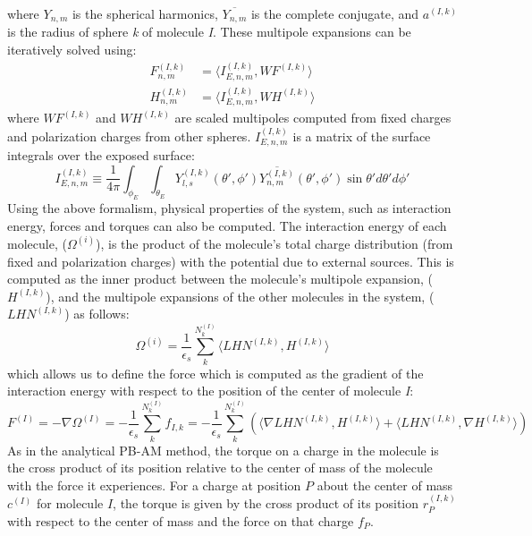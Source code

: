 \documentclass[12pt,titlepage]{article}
\begin{document}
%
where \(Y_{n,m}\) is the spherical harmonics, $\overline{Y_{n,m}}$ is the complete conjugate, and \(a^{(I,k)}\) is the radius of sphere \textit{k} of molecule \textit{I}.
These multipole expansions can be iteratively solved using:
%
\begin{align}
	F_{n,m}^{(I,k)} &= \langle I_{E, n,m} ^{(I,k)}, WF^{(I,k)} \rangle \label{eq:fmat_it} \\
	H_{n,m}^{(I,k)} &= \langle I_{E, n,m} ^{(I,k)}, WH^{(I,k)} \rangle
	\label{eq:hmat_it}
\end{align}
%
where $WF^{(I,k)}$ and $WH^{(I,k)}$ are scaled multipoles computed from fixed charges and polarization charges from other spheres.
\(I_{E,n,m}^{(I,k)}\) is a matrix of the surface integrals over the exposed surface:
%
\begin{equation}
	I_{E, n,m} ^{(I,k)} \equiv \frac{1}{4\pi } \int_{\phi_E} \int_{\theta_E} Y_{l,s}^{(I,k)}  (\theta', \phi') \overline{Y_{n,m}^{(I,k)}} (\theta', \phi') \sin \theta' d\theta' d \phi' 
	\label{eq:imat}
\end{equation}
%
Using the above formalism, physical properties of the system, such as interaction energy, forces and torques can also be computed.
The interaction energy of each molecule, ($\Omega^{(i)}$), is the product of the molecule's total charge distribution (from fixed and polarization charges) with the potential due to external sources.
This is computed as the inner product between the molecule's multipole expansion, ($H^{(I,k)}$), and the multipole expansions of the other molecules in the system, ($LHN^{(I,k)}$) as follows:
%
\begin{equation}
	\Omega^{(i)} = \frac{1}{\epsilon_s} \sum_{k}^{N_k^{(I)}}  \langle LHN^{(I,k)}, H^{(I,k)} \rangle
	\label{eq:pbsam_en_interact}
\end{equation}
%
which allows us to define the force which is computed as the gradient of the interaction energy with respect to the position of the center of molecule \textit{I}:
%
\begin{equation}
	F^{(I)} = - \nabla \Omega^{(I)} =  -  \frac{1}{\epsilon_s} \sum_{k}^{N_k^{(I)}} f_{I,k} = -  \frac{1}{\epsilon_s} \sum_{k}^{N_k^{(I)}}( \langle \nabla LHN^{(I,k)}, H^{(I,k)} \rangle +  \langle LHN^{(I,k)}, \nabla H^{(I,k)} \rangle)
	\label{eq:pbsam_force}
\end{equation}
%
As in the analytical PB-AM method, the torque on a charge in the molecule is the cross product of its position relative to the center of mass of the molecule with the force it experiences.
For a charge at position \(P\) about the center of mass \(c^{(I)}\) for molecule \(I\), the torque is given by the cross product of its position \(r_P^{(I,k)}\) with respect to the center of mass and the force on that charge $f_P$.
\end{document}
